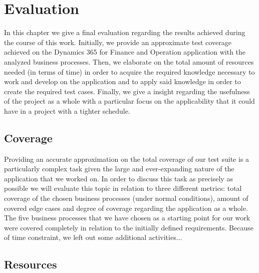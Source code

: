 \chapter{Evaluation}

In this chapter we give a final evaluation regarding the results achieved during the course of this work. Initially, we provide an approximate test coverage achieved on the Dynamics 365 for Finance and Operation application with the analyzed business processes. Then, we elaborate on the total amount of resources needed (in terms of time) in order to acquire the required knowledge necessary to work and develop on the application and to apply said knowledge in order to create the required test cases. Finally, we give a insight regarding the usefulness of the project as a whole with a particular focus on the applicability that it could have in a project with a tighter schedule.

\section{Coverage} 

Providing an accurate approximation on the total coverage of our test suite is a particularly complex task given the large and ever-expanding nature of the application that we worked on. In order to discuss this task as precisely as possible we will evaluate this topic in relation to three different metrics: total coverage of the chosen business processes (under normal conditions), amount of covered edge cases and degree of coverage regarding the application as a whole. The five business processes that we have chosen as a starting point for our work were covered completely in relation to the initially defined requirements. Because of time constraint, we left out some additional activities...



\section{Resources} 


